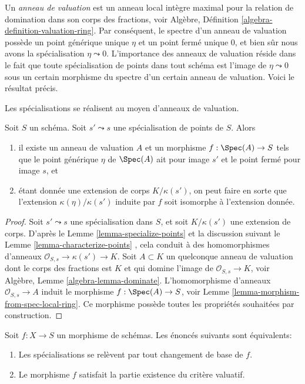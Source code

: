 \noindent
Un {\it anneau de valuation} est un anneau local intègre
maximal pour la relation de domination dans son corps des fractions, voir Algèbre,
Définition \ref{algebra-definition-valuation-ring}. Par conséquent, le spectre d'un anneau de valuation
possède un point générique unique $\eta$  et un point fermé
unique $0$, et bien sûr nous avons la spécialisation $\eta \leadsto 0$.
L'importance des anneaux de valuation réside dans le fait que toute spécialisation
de points dans tout schéma est l'image de $\eta \leadsto 0$ sous un certain morphisme du
spectre d'un certain anneau de valuation. Voici le résultat précis.

\begin{lemma}
\label{lemma-points-specialize}
\begin{slogan}
Les spécialisations se réalisent au moyen d'anneaux de valuation.
\end{slogan}
Soit $S$ un schéma. Soit $s' \leadsto s$ une spécialisation de
points de $S$. Alors
\begin{enumerate}
\item il existe un anneau de valuation  $A$  et un morphisme  $f : \Spec(A) \to S$  tels
que le point générique  $\eta$  de  $\Spec(A)$  ait pour image  $s'$  et le
point fermé pour image  $s$, et
\item étant donnée une extension de corps  $K/\kappa(s')$, on peut faire en sorte que
l'extension  $\kappa(\eta)/\kappa(s')$  induite par  $f$  soit isomorphe à l'extension
donnée.
\end{enumerate}
\end{lemma}

\begin{proof}
Soit  $s' \leadsto s$  une spécialisation dans  $S$, et soit  $K/\kappa(s')$  une
extension de corps. D'après le Lemme  \ref{lemma-specialize-points}  et la discussion suivant le
Lemme  \ref{lemma-characterize-points} , cela conduit à des homomorphismes d'anneaux  $\mathcal{O}_{S, s} \to \kappa(s') \to K$. Soit
 $A \subset K$  un quelconque anneau de valuation dont le corps des fractions est
 $K$  et qui domine l'image de  $\mathcal{O}_{S, s} \to K$, voir Algèbre, Lemme
 \ref{algebra-lemma-dominate}. L'homomorphisme d'anneaux  $\mathcal{O}_{S, s} \to A$  induit le morphisme
 $f : \Spec(A) \to S$, voir Lemme  \ref{lemma-morphism-from-spec-local-ring}. Ce morphisme possède toutes les propriétés
souhaitées par construction.
\end{proof}

\begin{lemma}
\label{lemma-lift-specializations-valuative}
Soit  $f : X \to S$  un morphisme de schémas. Les énoncés suivants sont équivalents:
\begin{enumerate}
\item Les spécialisations se relèvent par tout changement de base de  $f$.
\item Le morphisme  $f$  satisfait la partie existence du critère valuatif.
\end{enumerate}
\end{lemma}


